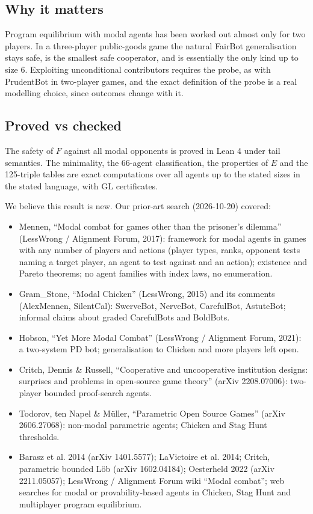 \documentclass{article}
\begin{document}
\subsection*{Why it matters}

Program equilibrium with modal agents has been worked out almost only for two players. In a
three-player public-goods game the natural FairBot generalisation stays safe, is the smallest safe
cooperator, and is essentially the only kind up to size 6. Exploiting unconditional contributors
requires the probe, as with PrudentBot in two-player games, and the exact definition of the probe
is a real modelling choice, since outcomes change with it.

\subsection*{Proved vs checked}

The safety of $F$ against all modal opponents is proved in Lean 4 under tail semantics. The
minimality, the 66-agent classification, the properties of $E$ and the 125-triple tables are exact
computations over all agents up to the stated sizes in the stated language, with GL certificates.

We believe this result is new. Our prior-art search (2026-10-20) covered:

\begin{itemize}
\item Mennen, ``Modal combat for games other than the prisoner's dilemma'' (LessWrong / Alignment Forum, 2017): framework for modal agents in games with any number of players and actions (player types, ranks, opponent tests naming a target player, an agent to test against and an action); existence and Pareto theorems; no agent families with index laws, no enumeration.
\item Gram\_Stone, ``Modal Chicken'' (LessWrong, 2015) and its comments (AlexMennen, SilentCal): SwerveBot, NerveBot, CarefulBot, AstuteBot; informal claims about graded CarefulBots and BoldBots.
\item Hobson, ``Yet More Modal Combat'' (LessWrong / Alignment Forum, 2021): a two-system PD bot; generalisation to Chicken and more players left open.
\item Critch, Dennis \& Russell, ``Cooperative and uncooperative institution designs: surprises and problems in open-source game theory'' (arXiv 2208.07006): two-player bounded proof-search agents.
\item Todorov, ten Napel \& Müller, ``Parametric Open Source Games'' (arXiv 2606.27068): non-modal parametric agents; Chicken and Stag Hunt thresholds.
\item Barasz et al. 2014 (arXiv 1401.5577); LaVictoire et al. 2014; Critch, parametric bounded Löb (arXiv 1602.04184); Oesterheld 2022 (arXiv 2211.05057); LessWrong / Alignment Forum wiki ``Modal combat''; web searches for modal or provability-based agents in Chicken, Stag Hunt and multiplayer program equilibrium.
\end{itemize}
\end{document}
